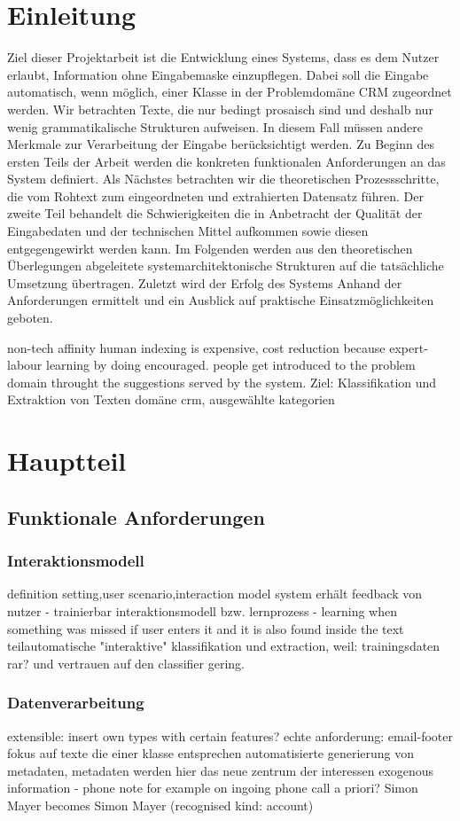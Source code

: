 \chapter{Einleitung}
Ziel dieser Projektarbeit ist die Entwicklung eines Systems, dass es dem Nutzer erlaubt, Information ohne Eingabemaske einzupflegen. Dabei soll die Eingabe automatisch, wenn möglich, einer Klasse in der Problemdomäne CRM zugeordnet werden. Wir betrachten Texte, die nur bedingt prosaisch sind und deshalb nur wenig grammatikalische Strukturen aufweisen. In diesem Fall müssen andere Merkmale zur Verarbeitung der Eingabe berücksichtigt werden.
Zu Beginn des ersten Teils der Arbeit werden die konkreten funktionalen Anforderungen an das System definiert. Als Nächstes betrachten wir die theoretischen Prozessschritte, die vom Rohtext zum eingeordneten und extrahierten Datensatz führen. Der zweite Teil behandelt die Schwierigkeiten die in Anbetracht der Qualität der Eingabedaten und der technischen Mittel aufkommen sowie diesen entgegengewirkt werden kann. Im Folgenden werden aus den theoretischen Überlegungen abgeleitete systemarchitektonische Strukturen auf die tatsächliche Umsetzung übertragen.
Zuletzt wird der Erfolg des Systems Anhand der Anforderungen ermittelt und ein Ausblick auf praktische Einsatzmöglichkeiten geboten.

non-tech affinity
human indexing is expensive, cost reduction because expert-labour
learning by doing encouraged. people get introduced to the problem domain throught the suggestions served by the system.
Ziel: Klassifikation und Extraktion von Texten
domäne crm, ausgewählte kategorien
\chapter{Hauptteil}
\section{Funktionale Anforderungen}
\subsection{Interaktionsmodell}
definition setting,user scenario,interaction model
system erhält feedback von nutzer - trainierbar
interaktionsmodell bzw. lernprozess - learning when something was missed if user enters it and it is also found inside the text
teilautomatische "interaktive" klassifikation und extraction, weil: trainingsdaten rar? und vertrauen auf den classifier gering.
\subsection{Datenverarbeitung}
extensible: insert own types with certain features?
echte anforderung: email-footer
fokus auf texte die einer klasse entsprechen
automatisierte generierung von metadaten, metadaten werden hier das neue zentrum der interessen
exogenous information - phone note for example on ingoing phone call
a priori?
Simon Mayer becomes Simon Mayer (recognised kind: account)

